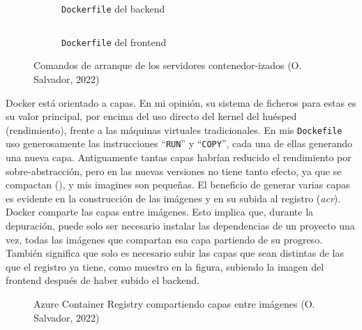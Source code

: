 \documentclass[11pt]{article}
\begin{document}
\begin{flushleft}
		\begin{figure}[htb]
			\centering
			\begin{subfigure}{0.3\textwidth}
				\inputminted[fontsize=\scriptsize, firstline=21, lastline=22, linenos, frame=single, breaklines]{dockerfile}{../../backend/Dockerfile}
			\caption{\texttt{Dockerfile} del backend}
			\end{subfigure}
			\hspace{1.5cm}
			\begin{subfigure}{0.5\textwidth}
				\inputminted[fontsize=\scriptsize, firstline=36, lastline=37, linenos, frame=single, breaklines]{dockerfile}{../../frontend/Dockerfile}
			\caption{\texttt{Dockerfile} del frontend}
			\end{subfigure}

			\caption{Comandos de arranque de los servidores contenedor-izados (O. Salvador, 2022)}
		\end{figure}

	\clearpage
	Docker está orientado a capas. En mi opinión, su sistema de ficheros para estas es su valor principal, por encima del uso directo del kernel del huésped (rendimiento), frente a las máquinas virtuales tradicionales. En mis \texttt{Dockefile} uso generosamente las instrucciones ``\texttt{RUN}'' y ``\texttt{COPY}'', cada una de ellas generando una nueva capa. Antiguamente tantas capas habrían reducido el rendimiento por sobre-abstracción, pero en las nuevas versiones no tiene tanto efecto, ya que se compactan (\cite{docker_layers}), y mis imagines son pequeñas. El beneficio de generar varias capas es evidente en la construcción de las imágenes y en su subida al registro (\textit{\acrshort{acr}}). Docker comparte las capas entre imágenes. Esto implica que, durante la depuración, puede solo ser necesario instalar las dependencias de un proyecto una vez, todas las imágenes que compartan esa capa partiendo de su progreso. También significa que solo es necesario subir las capas que sean distintas de las que el registro ya tiene, como muestro en la figura, subiendo la imagen del frontend después de haber subido el backend. 
	\linebreak
	
	\begin{figure}[htb]
		\centering
		\caption{Azure Container Registry compartiendo capas entre imágenes (O. Salvador, 2022)}
        \label{shared_layers}
	\end{figure}
	

\end{flushleft}
\end{document}
